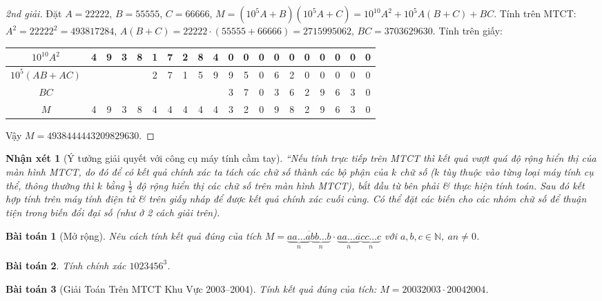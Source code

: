 \documentclass{article}
\newtheorem{baitoan}{Bài toán}
\newtheorem{nhanxet}{Nhận xét}
\begin{document}
\begin{proof}[2nd giải]
	Đặt $A = 22222$, $B = 55555$, $C = 66666$, $M = (10^5A + B)(10^5A + C) = 10^{10}A^2 + 10^5A(B + C) + BC$. Tính trên MTCT: $A^2 = 22222^2 = 493817284$, $A(B + C) = 22222\cdot(55555 + 66666) = 2715995062$, $BC = 3703629630$. Tính trên giấy:
	\begin{table}[H]
		\centering
		\begin{tabular}{|c|c|c|c|c|c|c|c|c|c|c|c|c|c|c|c|c|c|c|c|}
			\hline
			$10^{10}A^2$ & 4 & 9 & 3 & 8 & 1 & 7 & 2 & 8 & 4 & 0 & 0 & 0 & 0 & 0 & 0 & 0 & 0 & 0 & 0 \\
			\hline
			$10^5(AB + AC)$ &  &  &  &  & 2 & 7 & 1 & 5 & 9 & 9 & 5 & 0 & 6 & 2 & 0 & 0 & 0 & 0 & 0 \\
			\hline
			$BC$ &  &  &  &  &  &  &  &  &  & 3 & 7 & 0 & 3 & 6 & 2 & 9 & 6 & 3 & 0 \\
			\hline
			$M$ & 4 & 9 & 3 & 8 & 4 & 4 & 4 & 4 & 4 & 3 & 2 & 0 & 9 & 8 & 2 & 9 & 6 & 3 & 0 \\
			\hline
		\end{tabular}
	\end{table}
	\noindent Vậy $M = 4938444443209829630$.
\end{proof}

\begin{nhanxet}[Ý tưởng giải quyết với công cụ máy tính cầm tay]
	``Nếu tính trực tiếp trên MTCT thì kết quả vượt quá độ rộng hiển thị của màn hình MTCT, do đó để có kết quả chính xác ta tách các chữ số thành các bộ phận của $k$ chữ số ($k$ tùy thuộc vào từng loại máy tính cụ thể, thông thường thì $k$ bằng $\frac{1}{2}$ độ rộng hiển thị các chữ số trên màn hình MTCT), bắt đầu từ bên phải \& thực hiện tính toán. Sau đó kết hợp tính trên máy tính điện tử \& trên giấy nháp để được kết quả chính xác cuối cùng. Có thể đặt các biến cho các nhóm chữ số để thuận tiện trong biến đổi đại số (như ở 2 cách giải trên).
\end{nhanxet}

\begin{baitoan}[Mở rộng]
	Nêu cách tính kết quả đúng của tích $M = \overline{\underbrace{aa\ldots a}_n\underbrace{bb\ldots b}_n}\cdot\overline{\underbrace{aa\ldots a}_n\underbrace{cc\ldots c}_n}$ với $a,b,c\in\mathbb{N}$, $an\ne0$.
\end{baitoan}

\begin{baitoan}
	Tính chính xác $1023456^3$.
\end{baitoan}

\begin{baitoan}[Giải Toán Trên MTCT Khu Vực 2003--2004]
	Tính kết quả đúng của tích: $M = 20032003\cdot20042004$.
\end{baitoan}
\end{document}
